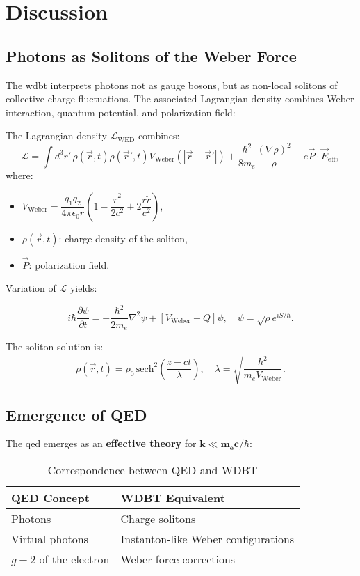 \chapter{Discussion}

\section{Photons as Solitons of the Weber Force}
The \gls{wdbt} interprets photons not as gauge bosons, but as non-local solitons of collective charge fluctuations. The associated Lagrangian density combines Weber interaction, quantum potential, and polarization field:

The Lagrangian density $\mathcal{L}_{\text{WED}}$ combines:
\begin{equation}
\mathcal{L} = \int d^3r'\, \rho(\vec{r},t) \rho(\vec{r}',t) V_{\text{Weber}}(|\vec{r}-\vec{r}'|) + \frac{\hbar^2}{8m_e} \frac{(\nabla \rho)^2}{\rho} - e \vec{P} \cdot \vec{E}_{\text{eff}},
\end{equation}
where:
\begin{itemize}
    \item $V_{\text{Weber}} = \dfrac{q_1 q_2}{4\pi \epsilon_0 r} \left(1 - \dfrac{\dot{r}^2}{2c^2} + 2 \dfrac{r \ddot{r}}{c^2}\right)$,
    \item $\rho(\vec{r},t)$: charge density of the soliton,
    \item $\vec{P}$: polarization field.
\end{itemize}

Variation of $\mathcal{L}$ yields:

\begin{equation}
i\hbar \frac{\partial \psi}{\partial t} = -\frac{\hbar^2}{2m_e} \nabla^2 \psi + \left[ V_{\text{Weber}} + Q \right] \psi, \quad \psi = \sqrt{\rho} e^{iS/\hbar}.
\end{equation}

The soliton solution is:
\begin{equation}
\rho(\vec{r},t) = \rho_0 \, \text{sech}^2\left(\frac{z - ct}{\lambda}\right), \quad \lambda = \sqrt{\frac{\hbar^2}{m_e V_{\text{Weber}}}}.
\end{equation}

\section{Emergence of QED}
The \gls{qed} emerges as an \textbf{effective theory} for $\mathbf{k \ll m_e c/\hbar}$:

\begin{table}[ht]
\centering
\begin{tabular}{ll}
\toprule
\textbf{QED Concept} & \textbf{WDBT Equivalent} \\
\midrule
Photons & Charge solitons \\
Virtual photons & Instanton-like Weber configurations \\
$g-2$ of the electron & Weber force corrections \\
\bottomrule
\end{tabular}
\caption{Correspondence between QED and WDBT}
\end{table}

